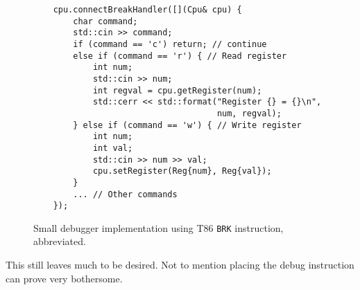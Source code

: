 \begin{figure}
    \begin{verbatim}
    cpu.connectBreakHandler([](Cpu& cpu) {
        char command;
        std::cin >> command;
        if (command == 'c') return; // continue
        else if (command == 'r') { // Read register
            int num;
            std::cin >> num;
            int regval = cpu.getRegister(num);
            std::cerr << std::format("Register {} = {}\n",
                                     num, regval);
        } else if (command == 'w') { // Write register
            int num;
            int val;
            std::cin >> num >> val;
            cpu.setRegister(Reg{num}, Reg{val});
        }
        ... // Other commands
    });
    \end{verbatim}
    \caption{Small debugger implementation using T86 \texttt{BRK} instruction,
    abbreviated.}
    \label{fig:t86-pocket-debugger}
\end{figure}

This still leaves much to be desired. Not to mention placing the debug
instruction can prove very bothersome.
